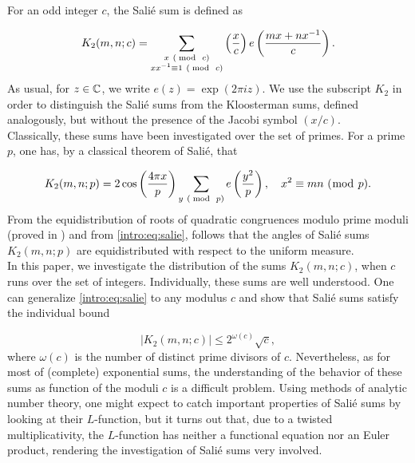\documentclass[leqno,10pt]{amsart}
\theoremstyle{plain}
\numberwithin{equation}{section}
\theoremstyle{definition}
\theoremstyle{remark}
\begin{document}
For an odd integer $c$, the Sali\'e sum is defined as 

\begin{equation*}
K_2(m,n;c)=\sum_{\substack{x\ (\bmod\  c) \\ x x^{-1} \equiv 1 \ (\bmod\  c)}} \left(\frac{x}{c}\right) e\left(\frac{mx+nx^{-1}}{c}\right).
\end{equation*}
As usual, for $z\in\mathbb{C}$, we write $e(z)=\exp(2\pi i z)$. We use the subscript $K_2$ in order to distinguish the Sali\'e sums from the Kloosterman sums, defined analogously, but without the presence of the Jacobi symbol $(x/c)$.\\ 

Classically, these sums have been investigated over the set of primes. For a prime $p$, one has, by a classical theorem of Sali\'e, that

\begin{equation}\label{intro:eq:salie}
K_2(m,n;p)= 2 \cos\left(\frac{4\pi x}{p}\right) \sum_{y\ (\bmod\  p)} e\left(\frac{y^2}{p}\right), \quad x^2 \equiv mn \ (\bmod\  p). 
\end{equation}
From the equidistribution of roots of quadratic congruences modulo prime moduli (proved in \cite{dfi7})  and from \eqref{intro:eq:salie}, follows that the angles of Sali\'e sums $K_2(m,n;p)$ are equidistributed with respect to the uniform measure.\\ 

In this paper, we investigate the distribution of the sums $K_2(m,n;c)$, when $c$ runs over the set of integers.
Individually, these sums are well understood. One can generalize \eqref{intro:eq:salie} to any modulus $c$ and show that Sali\'e sums satisfy the individual bound

\begin{equation}\label{intro:eq:bound}
\left\vert K_2(m,n;c)\right\vert \leqslant 2^{\omega(c)} \sqrt{c},
\end{equation}
where $\omega(c)$ is the number of distinct prime divisors of $c$. Nevertheless, as for most of (complete) exponential sums, the understanding of the behavior of these sums as function of the moduli $c$ is a difficult problem. Using methods of analytic number theory, one might expect to catch important properties of Sali\'e sums by looking at their $L$-function, but it turns out that, due to a twisted multiplicativity, the $L$-function has neither a functional equation nor an Euler product, rendering the investigation of Sali\'e sums very involved.\\  
\end{document}
